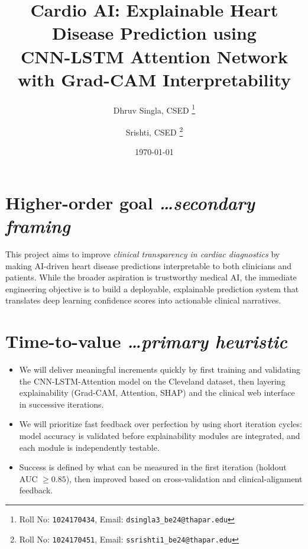 \documentclass[11pt,a4paper]{article}
\title{Cardio AI: Explainable Heart Disease Prediction using\\CNN-LSTM Attention Network with Grad-CAM Interpretability}
\author{
  Dhruv Singla, CSED%
  \thanks{Roll No: \texttt{1024170434}, %
    Email: \texttt{dsingla3\_be24@thapar.edu}}
  \and
  Srishti, CSED%
  \thanks{Roll No: \texttt{1024170451}, %
    Email: \texttt{ssrishti1\_be24@thapar.edu}}
}
\date{\today}
\newcommand{\BvrHint}[1]{%
  {\normalfont\normalsize\itshape\hfill #1}}
\begin{document}
\maketitle

\section{Higher-order goal%
  \BvrHint{\ldots secondary framing}}
This project aims to improve \emph{clinical transparency in cardiac
diagnostics} by making AI-driven heart disease predictions
interpretable to both clinicians and patients. While the broader
aspiration is trustworthy medical AI, the immediate engineering
objective is to build a deployable, explainable prediction system
that translates deep learning confidence scores into actionable
clinical narratives.

\section{Time-to-value%
  \BvrHint{\ldots primary heuristic}}
\begin{itemize}[leftmargin=0.7cm]
    \item We will deliver meaningful increments quickly by first
      training and validating the CNN-LSTM-Attention model on the
      Cleveland dataset, then layering explainability (Grad-CAM,
      Attention, SHAP) and the clinical web interface in successive
      iterations.
    \item We will prioritize fast feedback over perfection by using
      short iteration cycles: model accuracy is validated before
      explainability modules are integrated, and each module is
      independently testable.
    \item Success is defined by what can be measured in the first
      iteration (holdout AUC $\geq 0.85$), then improved based on
      cross-validation and clinical-alignment feedback.
\end{itemize}

\end{document}

